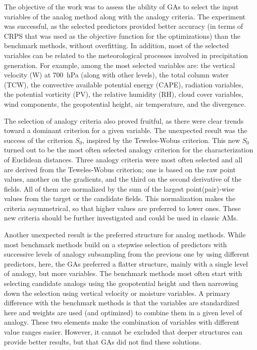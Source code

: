 \documentclass[draft]{agujournal2019}
\begin{document}
The objective of the work was to assess the ability of GAs to select the input variables of the analog method along with the analogy criteria. The experiment was successful, as the selected predictors provided better accuracy (in terms of CRPS that was used as the objective function for the optimizations) than the benchmark methods, without overfitting. In addition, most of the selected variables can be related to the meteorological processes involved in precipitation generation. For example, among the most selected variables are: the vertical velocity (W) at 700~hPa (along with other levels), the total column water (TCW), the convective available potential energy (CAPE), radiation variables, the potential vorticity (PV), the relative humidity (RH), cloud cover variables, wind components, the geopotential height, air temperature, and the divergence.

The selection of analogy criteria also proved fruitful, as there were clear trends toward a dominant criterion for a given variable. The unexpected result was the success of the criterion $S_{0}$, inspired by the Teweles-Wobus criterion. This new $S_{0}$ turned out to be the most often selected analogy criterion for the characterization of Euclidean distances. Three analogy criteria were most often selected and all are derived from the Teweles-Wobus criterion; one is based on the raw point values, another on the gradients, and the third on the second derivative of the fields. All of them are normalized by the sum of the largest point(pair)-wise values from the target or the candidate fields. This normalization makes the criteria asymmetrical, so that higher values are preferred to lower ones. These new criteria should be further investigated and could be used in classic AMs.

Another unexpected result is the preferred structure for analog methods. While most benchmark methods build on a stepwise selection of predictors with successive levels of analogy subsampling from the previous one by using different predictors, here, the GAs preferred a flatter structure, mainly with a single level of analogy, but more variables. The benchmark methods most often start with selecting candidate analogs using the geopotential height and then narrowing down the selection using vertical velocity or moisture variables. A primary difference with the benchmark methods is that the variables are standardized here and weights are used (and optimized) to combine them in a given level of analogy. These two elements make the combination of variables with different value ranges easier. However, it cannot be excluded that deeper structures can provide better results, but that GAs did not find these solutions.
\end{document}
